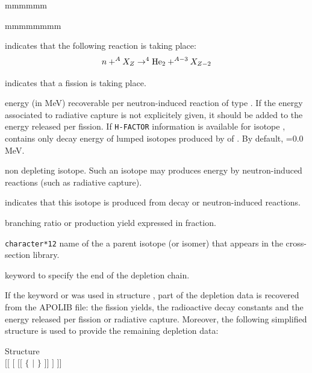 \begin{ListeDeDescription}{mmmmmm}
\begin{ListeDeDescription}{mmmmmmmm}
\item[\moc{NA}] indicates that the following reaction is taking place:
$$ n +^{A}X_Z \to ^4{\rm He}_2 + ^{A-3}X_{Z-2}$$

\item[\moc{NFTOT}] indicates that a fission is taking place.
\end{ListeDeDescription}

\item[\dusa{energy}] energy (in MeV) recoverable per neutron-induced
reaction of type . If the energy associated to radiative capture
is not explicitely given, it should be added to the energy released per fission.
If {\tt H-FACTOR} information is available for isotope , 
contains only decay energy of lumped isotopes produced by  of .
By default, =0.0 MeV.

\item[\moc{STABLE}] non depleting isotope. Such an isotope may produces
energy by neutron-induced reactions (such as radiative capture).

\item[\moc{FROM}] indicates that this isotope is produced from decay or
neutron-induced reactions.

\item[\dusa{yield}] branching ratio or production yield expressed in fraction.

\item[\dusa{NAMPAR}] {\tt character*12} name of the a parent isotope
(or isomer) that appears in the cross-section library.

\item[\moc{ENDCHAIN}] keyword to specify the end of the depletion chain.

\end{ListeDeDescription}

\vskip 0.15cm

If the keyword  or  was used in structure , part of the
depletion data is recovered from the APOLIB file: the fission yields, the
radioactive decay constants and the energy released per fission or radiative
capture. Moreover, the following simplified structure is used to provide the
remaining depletion data:

\begin{DataStructure}{Structure }
 \\
$[[$  $[$  $[[$ $\{$  $|$  $\}$
  $]]$ $]$ $]]$\\
\end{DataStructure}

